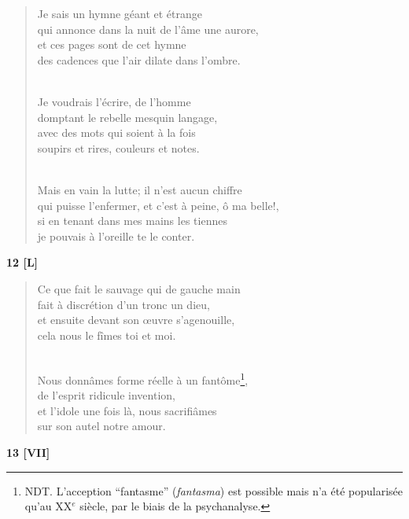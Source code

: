 \documentclass[a4paper,11pt]{book}
\begin{document}
\begin{verse}
Je sais un hymne géant et étrange \\
qui annonce dans la nuit de l'âme une aurore, \\
et ces pages sont de cet hymne \\
des cadences que l'air dilate dans l'ombre. \\ \

Je voudrais l'écrire, de l'homme \\
domptant le rebelle mesquin langage, \\
avec des mots qui soient à la fois \\
soupirs et rires, couleurs et notes. \\ \

Mais en vain la lutte; il n'est aucun chiffre \\
qui puisse l'enfermer, et c'est à peine, ô ma belle!, \\
si en tenant dans mes mains les tiennes \\
je pouvais à l'oreille te le conter. \\
\end{verse}

\bigskip

\begin{center} {\bf 12 [L]} \end{center}

\begin{verse}
Ce que fait le sauvage qui de gauche main \\
fait à discrétion d'un tronc un dieu, \\
et ensuite devant son {\oe}uvre s'agenouille, \\
cela nous le fîmes toi et moi. \\ \

Nous donnâmes forme réelle à un fantôme\footnote{NDT. L'acception ``fantasme'' ({\em fantasma}) est possible mais n'a été popularisée qu'au XX$^e$ siècle, par le biais de la psychanalyse.}, \\
de l'esprit ridicule invention, \\
et l'idole une fois là, nous sacrifiâmes \\
sur son autel notre amour. \\
\end{verse}

\newpage

\begin{center} {\bf 13 [VII]} \end{center}
\end{document}
